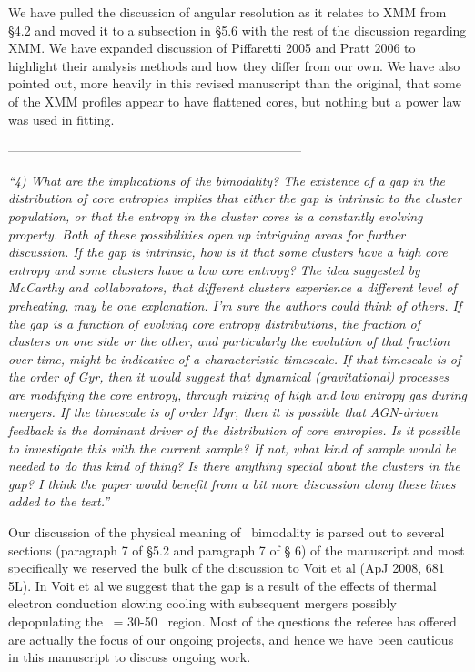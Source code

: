 \documentclass[11pt]{article}
\begin{document}
We have pulled the discussion of angular resolution as it relates to
XMM from \S 4.2 and moved it to a subsection in \S 5.6 with the rest
of the discussion regarding XMM. We have expanded discussion of
Piffaretti 2005 and Pratt 2006 to highlight their analysis methods and
how they differ from our own. We have also pointed out, more heavily
in this revised manuscript than the original, that some of the XMM
profiles appear to have flattened cores, but nothing but a power law
was used in fitting.

---------------------------------------------------------------------

{\it{``4) What are the implications of the bimodality? The existence
    of a gap in the distribution of core entropies implies that either
    the gap is intrinsic to the cluster population, or that the
    entropy in the cluster cores is a constantly evolving property.
    Both of these possibilities open up intriguing areas for further
    discussion. If the gap is intrinsic, how is it that some clusters
    have a high core entropy and some clusters have a low core
    entropy? The idea suggested by McCarthy and collaborators, that
    different clusters experience a different level of preheating, may
    be one explanation. I'm sure the authors could think of others.
    If the gap is a function of evolving core entropy distributions,
    the fraction of clusters on one side or the other, and
    particularly the evolution of that fraction over time, might be
    indicative of a characteristic timescale. If that timescale is of
    the order of Gyr, then it would suggest that dynamical
    (gravitational) processes are modifying the core entropy, through
    mixing of high and low entropy gas during mergers. If the
    timescale is of order Myr, then it is possible that AGN-driven
    feedback is the dominant driver of the distribution of core
    entropies. Is it possible to investigate this with the current
    sample? If not, what kind of sample would be needed to do this
    kind of thing?  Is there anything special about the clusters in
    the gap?  I think the paper would benefit from a bit more
    discussion along these lines added to the text.''}}

Our discussion of the physical meaning of \kna\ bimodality is parsed
out to several sections (paragraph 7 of \S 5.2 and paragraph 7 of \S
6) of the manuscript and most specifically we reserved the bulk of the
discussion to Voit et al (ApJ 2008, 681 5L). In Voit et al we suggest
that the gap is a result of the effects of thermal electron conduction
slowing cooling with subsequent mergers possibly depopulating the
\kna\ = 30-50 \ent\ region. Most of the questions the referee has
offered are actually the focus of our ongoing projects, and hence we
have been cautious in this manuscript to discuss ongoing work.
\end{document}
